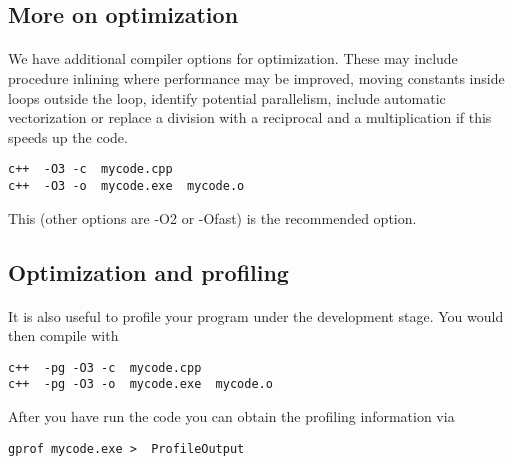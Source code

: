 \documentclass[%
oneside,                 %
final,                   %
10pt]{article}
\begin{document}
\subsection*{More on optimization}

\paragraph{}
We have additional compiler options for optimization. These may include procedure inlining where 
performance may be improved, moving constants inside loops outside the loop, 
identify potential parallelism, include automatic vectorization or replace a division with a reciprocal
and a multiplication if this speeds up the code.



\begin{verbatim}
c++  -O3 -c  mycode.cpp
c++  -O3 -o  mycode.exe  mycode.o

\end{verbatim}

This (other options are -O2 or -Ofast) is the recommended option.



\subsection*{Optimization and profiling}

\paragraph{}
It is also useful to profile your program under the development stage.
You would then compile with 



\begin{verbatim}
c++  -pg -O3 -c  mycode.cpp
c++  -pg -O3 -o  mycode.exe  mycode.o

\end{verbatim}

After you have run the code you can obtain the profiling information via


\begin{verbatim}
gprof mycode.exe >  ProfileOutput

\end{verbatim}
\end{document}
